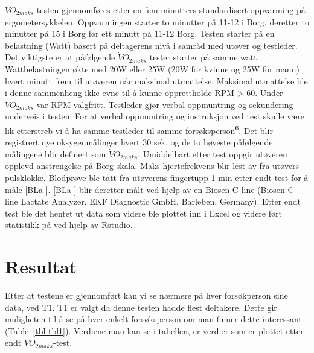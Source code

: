 \documentclass[
  letterpaper,
  DIV=11,
  numbers=noendperiod]{scrreprt}
\begin{document}
\(\dot{V}O_{2maks}\)-testen gjennomføres etter en fem minutters
standardisert oppvarming på ergometersykkelen. Oppvarmingen starter to
minutter på 11-12 i Borg, deretter to minutter på 15 i Borg før ett
minutt på 11-12 Borg. Testen starter på en belastning (Watt) basert på
deltagerens nivå i samråd med utøver og testleder. Det viktigste er at
påfølgende \(\dot{V}O_{2maks}\) tester starter på samme watt.
Wattbelastningen økte med 20W eller 25W (20W for kvinne og 25W for mann)
hvert minutt frem til utøveren når maksimal utmattelse. Maksimal
utmattelse ble i denne sammenheng ikke evne til å kunne opprettholde RPM
\textgreater{} 60. Under \(\dot{V}O_{2maks}\) var RPM valgfritt.
Testleder gjør verbal oppmuntring og sekundering underveis i testen. For
at verbal oppmuntring og instruksjon ved test skulle være lik etterstreb
vi å ha samme testleder til samme forsøksperson\textsuperscript{6}. Det
blir registrert nye oksygenmålinger hvert 30 sek, og de to høyeste
påfølgende målingene blir definert som \(\dot{V}O_{2maks}\). Umiddelbart
etter test oppgir utøveren opplevd anstrengelse på Borg skala. Maks
hjertefrekvens blir lest av fra utøvers pulsklokke. Blodprøve ble tatt
fra utøverens fingertupp 1 min etter endt test for å måle {[}BLa-{]}.
{[}BLa-{]} blir deretter målt ved hjelp av en Biosen C-line (Biosen
C-line Lactate Analyzer, EKF Diagnostic GmbH, Barleben, Germany). Etter
endt test ble det hentet ut data som videre ble plottet inn i Excel og
videre ført statistikk på ved hjelp av Rstudio.

\section{Resultat}\label{resultat}

Etter at testene er gjennomført kan vi se nærmere på hver forsøkperson
sine data, ved T1. T1 er valgt da denne testen hadde flest deltakere.
Dette gir muligheten til å se på hver enkelt forsøksperson om man finner
dette interessant (Table~\ref{tbl-tbl1}). Verdiene man kan se i
tabellen, er verdier som er plottet etter endt
\(\dot{V}O_{2maks}\)-test.
\end{document}
